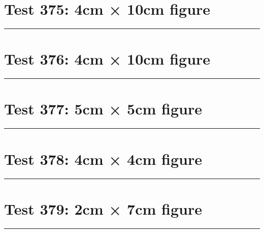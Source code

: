 \documentclass[a4paper,11pt]{article}
\begin{document}
\section*{Test 375: 4cm × 10cm figure}
\begin{swarmwrap}%
  \begin{minipage}[t]{4cm}
    \centering
    \rule{\linewidth}{10cm}
  \end{minipage}%
\end{swarmwrap}%
\swarmwrapnext
\lipsum[120]
\lipsum[121]
\lipsum[122]
\lipsum[123]
\lipsum[124]
\lipsum[125]
\section*{Test 376: 4cm × 10cm figure}
\begin{swarmwrap}%
  \begin{minipage}[t]{4cm}
    \centering
    \rule{\linewidth}{10cm}
  \end{minipage}%
\end{swarmwrap}%
\swarmwrapnext
\lipsum[117]
\lipsum[118]
\lipsum[119]
\section*{Test 377: 5cm × 5cm figure}
\begin{swarmwrap}%
  \begin{minipage}[t]{5cm}
    \centering
    \rule{\linewidth}{5cm}
  \end{minipage}%
\end{swarmwrap}%
\swarmwrapnext
\lipsum[123]
\lipsum[124]
\lipsum[125]
\lipsum[126]
\lipsum[127]
\section*{Test 378: 4cm × 4cm figure}
\begin{swarmwrap}%
  \begin{minipage}[t]{4cm}
    \centering
    \rule{\linewidth}{4cm}
  \end{minipage}%
\end{swarmwrap}%
\swarmwrapnext
\lipsum[117]
\lipsum[118]
\lipsum[119]
\section*{Test 379: 2cm × 7cm figure}
\begin{swarmwrap}%
  \begin{minipage}[t]{2cm}
    \centering
    \rule{\linewidth}{7cm}
  \end{minipage}%
\end{swarmwrap}%
\swarmwrapnext
\lipsum[131]
\lipsum[132]
\lipsum[133]
\end{document}
